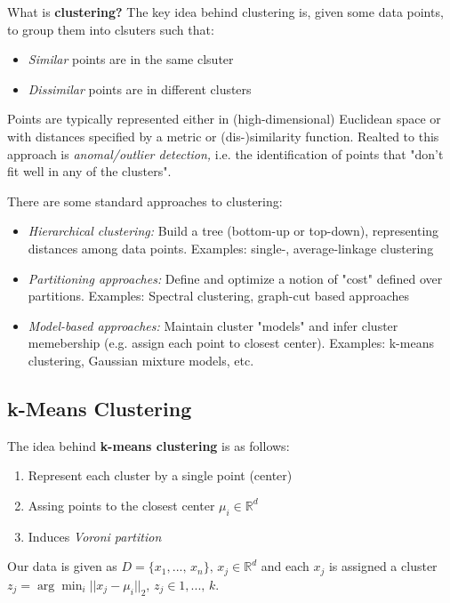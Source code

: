 \documentclass[a4paper]{extarticle}
\begin{document}
What is \textbf{clustering?} The key idea behind clustering is, given some data points, to group them into clsuters such that:
\begin{itemize}
    \item \textit{Similar} points are in the same clsuter
    \item \textit{Dissimilar} points are in different clusters
\end{itemize}
Points are typically represented either in (high-dimensional) Euclidean space or with distances specified by a metric or (dis-)similarity function. Realted to this approach is \textit{anomal/outlier detection,} i.e. the identification of points that "don't fit well in any of the clusters".

There are some standard approaches to clustering:
\begin{itemize}
    \item \textit{Hierarchical clustering:} Build a tree (bottom-up or top-down), representing distances among data points. Examples: single-, average-linkage clustering
    \item \textit{Partitioning approaches:} Define and optimize a notion of "cost" defined over partitions. Examples: Spectral clustering, graph-cut based approaches
    \item \textit{Model-based approaches:} Maintain cluster "models" and infer cluster memebership (e.g. assign each point to closest center). Examples: k-means clustering, Gaussian mixture models, etc.
\end{itemize}

\subsection{k-Means Clustering}

The idea behind \textbf{k-means clustering} is as follows:
\begin{enumerate}
    \item Represent each cluster by a single point (center)
    \item Assing points to the closest center $\mu_i \in \mathbb{R}^d$
    \item Induces \textit{Voroni partition}
\end{enumerate}
Our data is given as $D = \{x_1,..., \, x_n\}, \, x_j \in \mathbb{R}^d$ and each $x_j$ is assigned a cluster $z_j = \arg \min_i ||x_j - \mu_i||_2, \, z_j \in {1,..., \, k}$.
\end{document}
